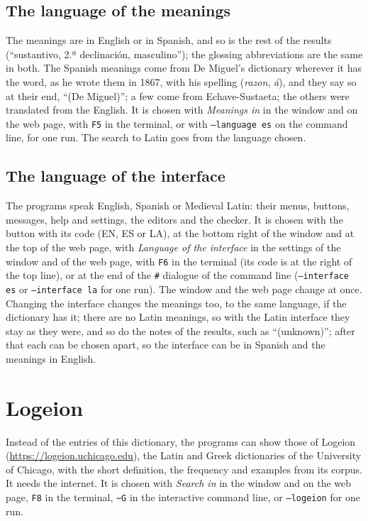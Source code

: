 \documentclass[12pt,
              article,
              oneside
              ]{memoir}
\newcommand*{\menu}[1]{\textit{#1}}
\newcommand*{\key}[1]{\texttt{#1}}
\newcommand*{\tl}{\textasciitilde}
\begin{document}
\subsection{The language of the meanings}

%
The meanings are in English or in Spanish, and so is the rest of the
results (\enquote{sustantivo, 2.ª declinación, masculino}); the glossing
abbreviations are the same in both. The Spanish meanings come from De
Miguel's dictionary wherever it has the word, as he wrote them in 1867,
with his spelling (\textit{razon}, \textit{á}), and they say so at their
end, \enquote{(De Miguel)}; a few come from Echave-Sustaeta; the others
were translated from the English. It is chosen with \menu{Meanings in} in
the window and on the web page, with \key{F5} in the terminal, or with
\texttt{--language es} on the command line, for one run. The search to
Latin goes from the language chosen.

\subsection{The language of the interface}

%
The programs speak English, Spanish or Medieval Latin: their menus,
buttons, messages,
help and settings, the editors and the checker. It is chosen with the
button with its code (EN, ES or LA), at the bottom right of the window
and at the top of the web page, with \menu{Language of the interface} in
the settings of the window and of the web page, with \key{F6} in the
terminal (its code is at the right of the top line), or at the end of the \texttt{\#}
dialogue of the command line (\texttt{--interface es} or
\texttt{--interface la} for one run). The window and the web page change
at once. Changing the interface changes the meanings too, to the same
language, if the dictionary has it; there are no Latin meanings, so with
the Latin interface they stay as they were, and so do the notes of the
results, such as \enquote{(unknown)}; after that each can be chosen apart,
so the interface can be in Spanish and the meanings in English.

\section{Logeion}
\label{sec:logeion}

%
Instead of the entries of this dictionary, the programs can show those of
Logeion (\url{https://logeion.uchicago.edu}), the Latin and Greek dictionaries of
the University of Chicago, with the short definition, the frequency and
examples from its corpus. It needs the internet. It is chosen with
\menu{Search in} in the window and on the web page, \key{F8} in the
terminal, \texttt{\tl G} in the interactive command line, or
\texttt{--logeion} for one run.
\end{document}
